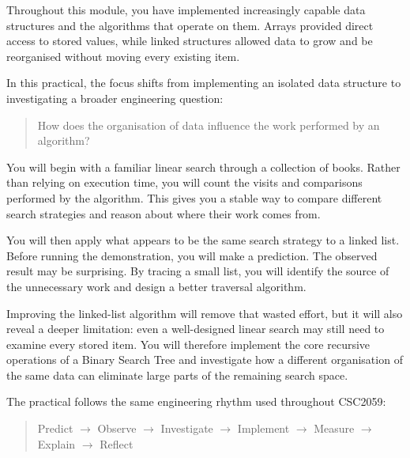 \documentclass{csc2059practical}
\begin{document}
\maketitle

\tableofcontents
\clearpage



Throughout this module, you have implemented increasingly capable data
structures and the algorithms that operate on them. Arrays provided direct
access to stored values, while linked structures allowed data to grow and be
reorganised without moving every existing item.

In this practical, the focus shifts from implementing an isolated data structure
to investigating a broader engineering question:

\begin{quote}
How does the organisation of data influence the work performed by an algorithm?
\end{quote}

You will begin with a familiar linear search through a collection of books.
Rather than relying on execution time, you will count the visits and comparisons
performed by the algorithm. This gives you a stable way to compare different
search strategies and reason about where their work comes from.

You will then apply what appears to be the same search strategy to a linked
list. Before running the demonstration, you will make a prediction. The observed
result may be surprising. By tracing a small list, you will identify the source
of the unnecessary work and design a better traversal algorithm.

Improving the linked-list algorithm will remove that wasted effort, but it will
also reveal a deeper limitation: even a well-designed linear search may still
need to examine every stored item. You will therefore implement the core
recursive operations of a Binary Search Tree and investigate how a different
organisation of the same data can eliminate large parts of the remaining search
space.

The practical follows the same engineering rhythm used throughout CSC2059:

\begin{quote}
Predict $\rightarrow$ Observe $\rightarrow$ Investigate $\rightarrow$ Implement
$\rightarrow$ Measure $\rightarrow$ Explain $\rightarrow$ Reflect
\end{quote}
\end{document}
